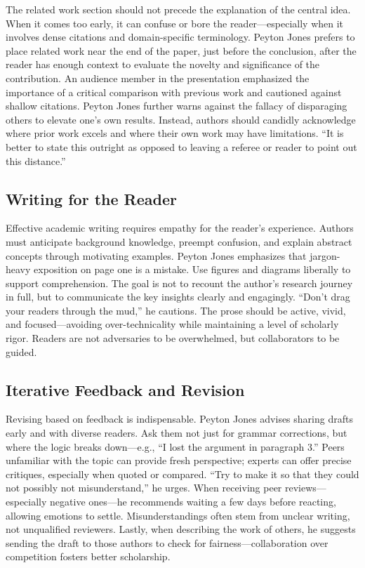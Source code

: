 The related work section should not precede the explanation of the central idea.
When it comes too early, it can confuse or bore the reader---especially when it involves dense citations and domain-specific terminology.
Peyton Jones prefers to place related work near the end of the paper, just before the conclusion, after the reader has enough context to evaluate the novelty and significance of the contribution.
An audience member in the presentation emphasized the importance of a critical comparison with previous work and cautioned against shallow citations.
Peyton Jones further warns against the fallacy of disparaging others to elevate one's own results.
Instead, authors should candidly acknowledge where prior work excels and where their own work may have limitations.
``It is better to state this outright as opposed to leaving a referee or reader to point out this distance.''

\subsection*{Writing for the Reader}

Effective academic writing requires empathy for the reader's experience.
Authors must anticipate background knowledge, preempt confusion, and explain abstract concepts through motivating examples.
Peyton Jones emphasizes that jargon-heavy exposition on page one is a mistake.
Use figures and diagrams liberally to support comprehension.
The goal is not to recount the author's research journey in full, but to communicate the key insights clearly and engagingly.
``Don't drag your readers through the mud,'' he cautions.
The prose should be active, vivid, and focused---avoiding over-technicality while maintaining a level of scholarly rigor.
Readers are not adversaries to be overwhelmed, but collaborators to be guided.

\subsection*{Iterative Feedback and Revision}

Revising based on feedback is indispensable.
Peyton Jones advises sharing drafts early and with diverse readers.
Ask them not just for grammar corrections, but where the logic breaks down---e.g., ``I lost the argument in paragraph 3.''
Peers unfamiliar with the topic can provide fresh perspective; experts can offer precise critiques, especially when quoted or compared.
``Try to make it so that they could not possibly not misunderstand,'' he urges.
When receiving peer reviews---especially negative ones---he recommends waiting a few days before reacting, allowing emotions to settle.
Misunderstandings often stem from unclear writing, not unqualified reviewers.
Lastly, when describing the work of others, he suggests sending the draft to those authors to check for fairness---collaboration over competition fosters better scholarship.
